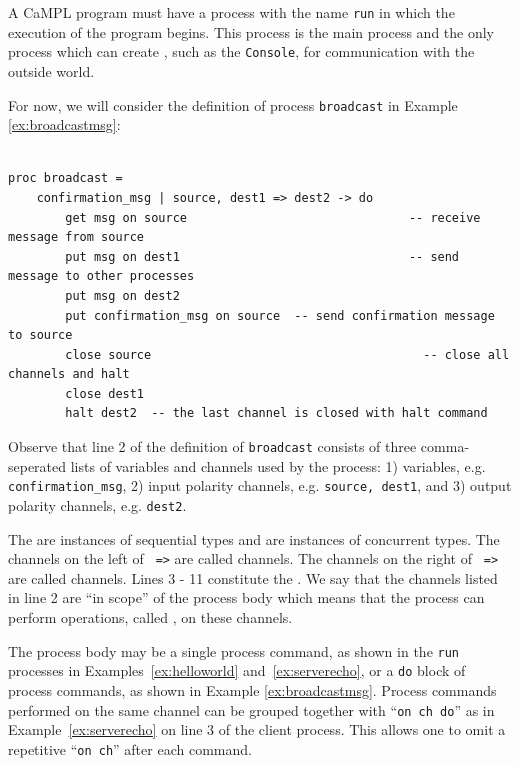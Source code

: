 \documentclass[11pt]{article}
\begin{document}
A CaMPL program must have a process with the name \lstinline$run$ in which the execution of the program begins. This process is the main process and the only process which can create , such as the \lstinline$Console$, for communication with the outside world.

For now, we will consider the definition of process \lstinline$broadcast$ in Example \ref{ex:broadcastmsg}:
\begin{lstlisting}[label=ex:broadcastmsg, caption=Process that broadcasts a message from a single source] %can we change listing so that it says Example insted of Listing in the caption?

proc broadcast = 
	confirmation_msg | source, dest1 => dest2 -> do
		get msg on source								-- receive message from source
		put msg on dest1								-- send message to other processes
		put msg on dest2
		put confirmation_msg on source	-- send confirmation message to source
		close source									  -- close all channels and halt
		close dest1
		halt dest2  -- the last channel is closed with halt command
\end{lstlisting}
Observe that line 2 of the definition of \lstinline$broadcast$ consists of three comma-seperated lists of variables and channels used by the process: 1) variables, e.g. \lstinline$confirmation_msg$, 2) input polarity channels, e.g. \lstinline$source, dest1$, and 3) output polarity channels, e.g. \lstinline$dest2$.

The  are instances of sequential types and  are instances of concurrent types.
The channels on the left of \lstinline$ =>$ are called  channels. 
The channels on the right of \lstinline$ =>$ are called  channels. 
Lines 3 - 11 constitute the .
We say that the channels listed in line 2 are ``in scope'' of the process body which means that the process can perform operations, called , on these channels.

The process body may be a single process command, as shown in the \lstinline$run$ processes in Examples~\ref{ex:helloworld} and~\ref{ex:serverecho}, or a \lstinline$do$ block of process commands, as shown in Example \ref{ex:broadcastmsg}. 
Process commands performed on the same channel can be grouped together with ``\lstinline$on ch do$'' as in Example~\ref{ex:serverecho} on line 3 of the client process.
This allows one to omit a repetitive ``\lstinline$on ch$'' after each command.
\end{document}
